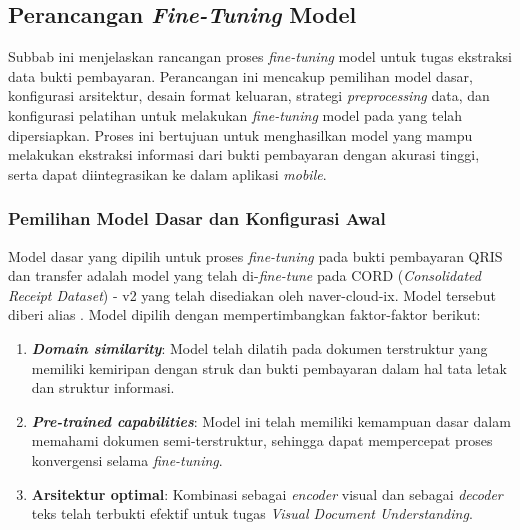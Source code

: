 \subsection{Perancangan \emph{Fine-Tuning} Model \donut}
\label{subsec:perancangan-fine-tuning-model}

Subbab ini menjelaskan rancangan proses \emph{fine-tuning} model \donut{} untuk tugas ekstraksi data bukti pembayaran. Perancangan ini mencakup pemilihan model dasar, konfigurasi arsitektur, desain format keluaran, strategi \emph{preprocessing} data, dan konfigurasi pelatihan untuk melakukan \emph{fine-tuning} model \donut{} pada \dataset{} yang telah dipersiapkan. Proses ini bertujuan untuk menghasilkan model yang mampu melakukan ekstraksi informasi dari bukti pembayaran dengan akurasi tinggi, serta dapat diintegrasikan ke dalam aplikasi \emph{mobile}.

\subsubsection{Pemilihan Model Dasar dan Konfigurasi Awal}
\label{subsubsec:pemilihan-model-dasar}

Model dasar yang dipilih untuk proses \emph{fine-tuning} pada \dataset{} bukti pembayaran QRIS dan transfer adalah model \donut{} yang telah di-\emph{fine-tune} pada \dataset{} \linebreak CORD (\emph{Consolidated Receipt Dataset}) - v2 yang telah disediakan oleh naver-cloud-ix. Model tersebut diberi alias \donutcord. Model \donutcord{} dipilih dengan mempertimbangkan faktor-faktor berikut:

\begin{enumerate}
    \item \textbf{\emph{Domain similarity}}: Model \donutcord{} telah dilatih pada \dataset{} dokumen terstruktur yang memiliki kemiripan dengan struk dan bukti pembayaran dalam hal tata letak dan struktur informasi.
    \item \textbf{\emph{Pre-trained capabilities}}: Model ini telah memiliki kemampuan dasar dalam memahami dokumen semi-terstruktur, sehingga dapat mempercepat proses konvergensi selama \emph{fine-tuning}.
    \item \textbf{Arsitektur optimal}: Kombinasi \swin{} sebagai \emph{encoder} visual dan \bart{} sebagai \emph{decoder} teks telah terbukti efektif untuk tugas \emph{Visual Document Understanding}.
\end{enumerate}

